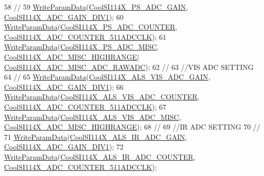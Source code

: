 \begin{DoxyCode}
58   \textcolor{comment}{//}
59   \hyperlink{class_cool_s_i114_x_abf45eb10a6de1be16e68a51624fa2608}{WriteParamData}(\hyperlink{_cool_s_i114_x_8h_a9f4721e98c347974ef68c10688301865}{CoolSI114X\_PS\_ADC\_GAIN}, 
      \hyperlink{_cool_s_i114_x_8h_a017b11f661d622c12ae6c4a0b7c75b49}{CoolSI114X\_ADC\_GAIN\_DIV1});
60   \hyperlink{class_cool_s_i114_x_abf45eb10a6de1be16e68a51624fa2608}{WriteParamData}(\hyperlink{_cool_s_i114_x_8h_a1afb31a7397d3b24e016619d21c9ed95}{CoolSI114X\_PS\_ADC\_COUNTER}, 
      \hyperlink{_cool_s_i114_x_8h_ae2cd58ec191df4bb0064d2988dd48bb3}{CoolSI114X\_ADC\_COUNTER\_511ADCCLK});
61   \hyperlink{class_cool_s_i114_x_abf45eb10a6de1be16e68a51624fa2608}{WriteParamData}(\hyperlink{_cool_s_i114_x_8h_a4ed2088455b7e027f5000930f9b93536}{CoolSI114X\_PS\_ADC\_MISC}, 
      \hyperlink{_cool_s_i114_x_8h_ae61574409fb527be2e1a3525845a74a2}{CoolSI114X\_ADC\_MISC\_HIGHRANGE}|
      \hyperlink{_cool_s_i114_x_8h_acbd6bc10abbe6b576d7268af6fd0a96e}{CoolSI114X\_ADC\_MISC\_ADC\_RAWADC}); 
62   \textcolor{comment}{//}
63   \textcolor{comment}{//VIS ADC SETTING}
64   \textcolor{comment}{//}
65   \hyperlink{class_cool_s_i114_x_abf45eb10a6de1be16e68a51624fa2608}{WriteParamData}(\hyperlink{_cool_s_i114_x_8h_a33228440ff5d87d7758236667c9ac493}{CoolSI114X\_ALS\_VIS\_ADC\_GAIN}, 
      \hyperlink{_cool_s_i114_x_8h_a017b11f661d622c12ae6c4a0b7c75b49}{CoolSI114X\_ADC\_GAIN\_DIV1});
66   \hyperlink{class_cool_s_i114_x_abf45eb10a6de1be16e68a51624fa2608}{WriteParamData}(\hyperlink{_cool_s_i114_x_8h_ab763f6a5a24422fbc3c1bdaa97971a4c}{CoolSI114X\_ALS\_VIS\_ADC\_COUNTER}, 
      \hyperlink{_cool_s_i114_x_8h_ae2cd58ec191df4bb0064d2988dd48bb3}{CoolSI114X\_ADC\_COUNTER\_511ADCCLK});
67   \hyperlink{class_cool_s_i114_x_abf45eb10a6de1be16e68a51624fa2608}{WriteParamData}(\hyperlink{_cool_s_i114_x_8h_a77e43431c7ce0dd3989ae01e81c579cb}{CoolSI114X\_ALS\_VIS\_ADC\_MISC}, 
      \hyperlink{_cool_s_i114_x_8h_ae61574409fb527be2e1a3525845a74a2}{CoolSI114X\_ADC\_MISC\_HIGHRANGE});
68   \textcolor{comment}{//}
69   \textcolor{comment}{//IR ADC SETTING}
70   \textcolor{comment}{//}
71   \hyperlink{class_cool_s_i114_x_abf45eb10a6de1be16e68a51624fa2608}{WriteParamData}(\hyperlink{_cool_s_i114_x_8h_a92866f1b5458764f9bea38772e7f45f7}{CoolSI114X\_ALS\_IR\_ADC\_GAIN}, 
      \hyperlink{_cool_s_i114_x_8h_a017b11f661d622c12ae6c4a0b7c75b49}{CoolSI114X\_ADC\_GAIN\_DIV1});
72   \hyperlink{class_cool_s_i114_x_abf45eb10a6de1be16e68a51624fa2608}{WriteParamData}(\hyperlink{_cool_s_i114_x_8h_a48cca7de1d186a179d619a666d849aab}{CoolSI114X\_ALS\_IR\_ADC\_COUNTER}, 
      \hyperlink{_cool_s_i114_x_8h_ae2cd58ec191df4bb0064d2988dd48bb3}{CoolSI114X\_ADC\_COUNTER\_511ADCCLK});

\end{DoxyCode}
